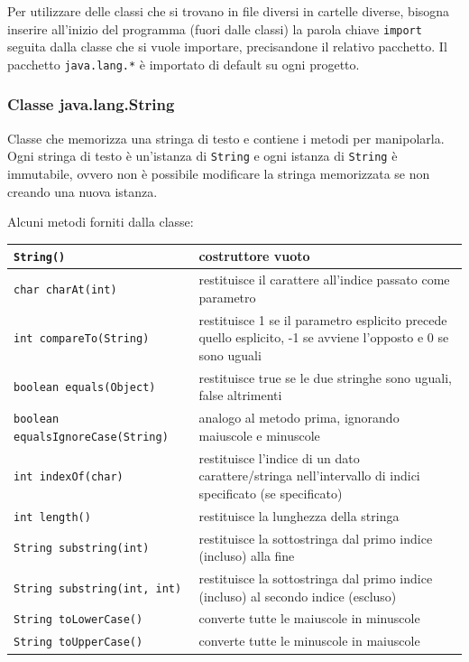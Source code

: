 \documentclass[a4paper]{article}
\begin{document}
Per utilizzare delle classi che si trovano in file diversi in cartelle diverse, bisogna inserire all'inizio del programma (fuori dalle classi)
la parola chiave \verb|import| seguita dalla classe che si vuole importare, precisandone il relativo pacchetto. Il pacchetto \verb|java.lang.*|
è importato di default su ogni progetto.

\newpage


\subsubsection*{Classe java.lang.String}
Classe che memorizza una stringa di testo e contiene i metodi per manipolarla. Ogni stringa di testo è un'istanza di \verb|String| e ogni istanza di
\verb|String| è immutabile, ovvero non è possibile modificare la stringa memorizzata se non creando una nuova istanza.

Alcuni metodi forniti dalla classe:
\begin{center}
	\begin{tabularx}{\textwidth}{l X}
		\toprule
		\verb|String()| & costruttore vuoto \\
		\midrule
		\verb|char charAt(int)| & restituisce il carattere all'indice passato come parametro \\
		\midrule
		\verb|int compareTo(String)| & restituisce 1 se il parametro esplicito precede quello esplicito, -1 se avviene l'opposto e 0 se sono uguali \\
		\midrule
		\verb|boolean equals(Object)| & restituisce true se le due stringhe sono uguali, false altrimenti \\
		\midrule
		\verb|boolean equalsIgnoreCase(String)| & analogo al metodo prima, ignorando maiuscole e minuscole \\
		\midrule
		\verb|int indexOf(char)| & restituisce l'indice di un dato carattere/stringa nell'intervallo di indici specificato (se specificato) \\
		\midrule
		\verb|int length()| & restituisce la lunghezza della stringa \\
		\midrule
		\verb|String substring(int)| & restituisce la sottostringa dal primo indice (incluso) alla fine \\
		\midrule
		\verb|String substring(int, int)| & restituisce la sottostringa dal primo indice (incluso) al secondo indice (escluso) \\
		\midrule
		\verb|String toLowerCase()| & converte tutte le maiuscole in minuscole \\
		\midrule
		\verb|String toUpperCase()| & converte tutte le minuscole in maiuscole \\
		\bottomrule
	\end{tabularx}
\end{center}
\end{document}

